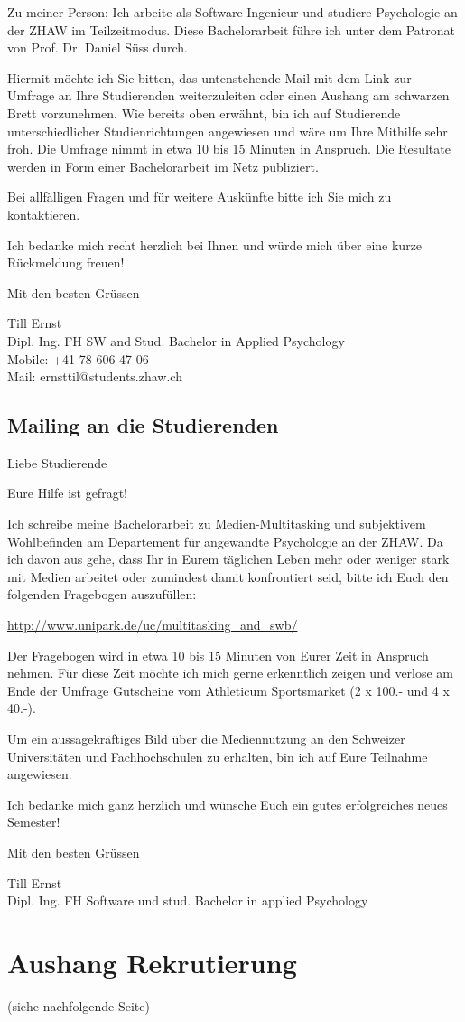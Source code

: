 \begin{RaggedRight}
Zu meiner Person: Ich arbeite als Software Ingenieur und studiere Psychologie an der ZHAW im Teilzeitmodus. Diese Bachelorarbeit führe ich unter dem Patronat von Prof. Dr. Daniel Süss durch.

Hiermit möchte ich Sie bitten, das untenstehende Mail mit dem Link zur Umfrage an Ihre Studierenden weiterzuleiten oder einen Aushang am schwarzen Brett vorzunehmen. Wie bereits oben erwähnt, bin ich auf Studierende unterschiedlicher Studienrichtungen angewiesen und wäre um Ihre Mithilfe sehr froh. Die Umfrage nimmt in etwa 10 bis 15 Minuten in Anspruch. Die Resultate werden in Form einer Bachelorarbeit im Netz publiziert.

Bei allfälligen Fragen und für weitere Auskünfte bitte ich Sie mich zu kontaktieren.

Ich bedanke mich recht herzlich bei Ihnen und würde mich über eine kurze Rückmeldung freuen!

Mit den besten Grüssen

Till Ernst\\
Dipl. Ing. FH SW and Stud. Bachelor in Applied Psychology\\
Mobile: +41 78 606 47 06\\
Mail:  ernsttil@students.zhaw.ch 

\subsection{Mailing an die Studierenden}
Liebe Studierende

Eure Hilfe ist gefragt!

Ich schreibe meine Bachelorarbeit zu Medien-Multitasking und subjektivem Wohlbefinden am Departement für angewandte Psychologie an der ZHAW. Da ich davon aus gehe, dass Ihr in Eurem täglichen Leben mehr oder weniger stark mit Medien arbeitet oder zumindest damit konfrontiert seid, bitte ich Euch den folgenden Fragebogen auszufüllen:

\url{http://www.unipark.de/uc/multitasking_and_swb/}

Der Fragebogen wird in etwa 10 bis 15 Minuten von Eurer Zeit in Anspruch nehmen. Für diese Zeit möchte ich mich gerne erkenntlich zeigen und verlose am Ende der Umfrage Gutscheine vom Athleticum Sportsmarket (2 x 100.- und 4 x 40.-).

Um ein aussagekräftiges Bild über die Mediennutzung an den Schweizer Universitäten und Fachhochschulen zu erhalten, bin ich auf Eure Teilnahme angewiesen.

Ich bedanke mich ganz herzlich und wünsche Euch ein gutes erfolgreiches neues Semester!

Mit den besten Grüssen

Till Ernst\\
Dipl. Ing. FH Software und stud. Bachelor in applied Psychology

\section{Aushang Rekrutierung}\label{appendix.aushang}
(siehe nachfolgende Seite)


\end{RaggedRight}